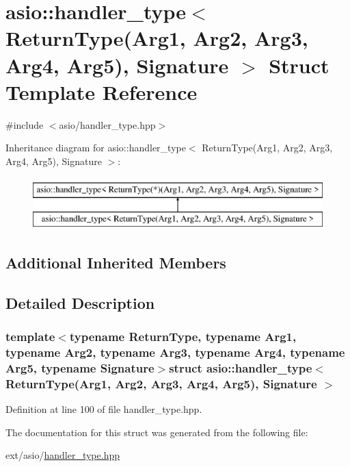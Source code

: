 \hypertarget{structasio_1_1handler__type_3_01_return_type_07_arg1_00_01_arg2_00_01_arg3_00_01_arg4_00_01_arg5_08_00_01_signature_01_4}{}\section{asio\+:\+:handler\+\_\+type$<$ Return\+Type(Arg1, Arg2, Arg3, Arg4, Arg5), Signature $>$ Struct Template Reference}
\label{structasio_1_1handler__type_3_01_return_type_07_arg1_00_01_arg2_00_01_arg3_00_01_arg4_00_01_arg5_08_00_01_signature_01_4}


{\ttfamily \#include $<$asio/handler\+\_\+type.\+hpp$>$}

Inheritance diagram for asio\+:\+:handler\+\_\+type$<$ Return\+Type(Arg1, Arg2, Arg3, Arg4, Arg5), Signature $>$\+:\begin{figure}[H]
\begin{center}
\leavevmode
\includegraphics[height=2.000000cm]{structasio_1_1handler__type_3_01_return_type_07_arg1_00_01_arg2_00_01_arg3_00_01_arg4_00_01_arg5_08_00_01_signature_01_4}
\end{center}
\end{figure}
\subsection*{Additional Inherited Members}


\subsection{Detailed Description}
\subsubsection*{template$<$typename Return\+Type, typename Arg1, typename Arg2, typename Arg3, typename Arg4, typename Arg5, typename Signature$>$struct asio\+::handler\+\_\+type$<$ Return\+Type(\+Arg1, Arg2, Arg3, Arg4, Arg5), Signature $>$}



Definition at line 100 of file handler\+\_\+type.\+hpp.



The documentation for this struct was generated from the following file\+:\begin{DoxyCompactItemize}
\item 
ext/asio/\hyperlink{handler__type_8hpp}{handler\+\_\+type.\+hpp}\end{DoxyCompactItemize}

